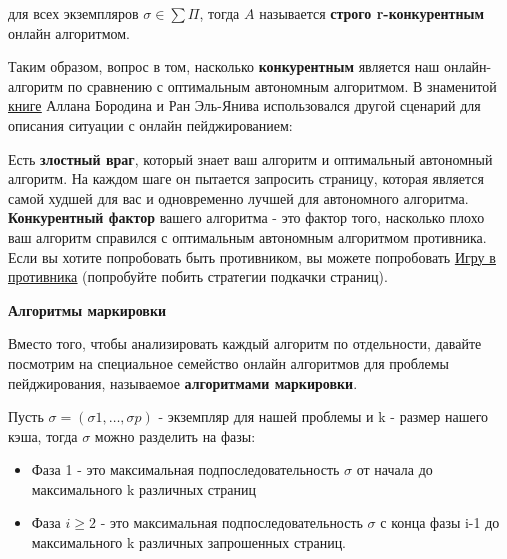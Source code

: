 для всех экземпляров $\sigma\in\sum\Pi$, тогда $A$ называется \textbf{строго r-конкурентным} онлайн алгоритмом.

\vspace{\baselineskip}

Таким образом, вопрос в том, насколько \textbf{конкурентным} является наш онлайн-алгоритм по сравнению с оптимальным автономным алгоритмом. В знаменитой \href{http://www.cs.technion.ac.il/~rani/book.html}{\underline{книге}} Аллана Бородина и Ран Эль-Янива использовался другой сценарий для описания ситуации с онлайн пейджированием:

\vspace{\baselineskip}

Есть \textbf{злостный враг}, который знает ваш алгоритм и оптимальный автономный алгоритм. На каждом шаге он пытается запросить страницу, которая является самой худшей для вас и одновременно лучшей для автономного алгоритма. \textbf{Конкурентный фактор} вашего алгоритма - это фактор того, насколько плохо ваш алгоритм справился с оптимальным автономным алгоритмом противника. Если вы хотите попробовать быть противником, вы можете попробовать \href{https://pastebin.com/u/kgoedde/1/Wak9refA}{\underline{Игру в противника}} (попробуйте побить стратегии подкачки страниц).

\vspace{\baselineskip}

\textbf{Алгоритмы маркировки}

\vspace{\baselineskip}

Вместо того, чтобы анализировать каждый алгоритм по отдельности, давайте посмотрим на специальное семейство онлайн алгоритмов для проблемы пейджирования, называемое \textbf{алгоритмами маркировки}.

\vspace{\baselineskip}

Пусть $\sigma = (\sigma 1, \dots, \sigma p)$ - экземпляр для нашей проблемы и k - размер нашего кэша, тогда $\sigma$ можно разделить на фазы:

\begin{itemize}
    \item Фаза 1 - это максимальная подпоследовательность $\sigma$ от начала до максимального k различных страниц
    \item Фаза $i \geq 2$ - это максимальная подпоследовательность $\sigma$ с конца фазы i-1 до максимального k различных запрошенных страниц.
\end{itemize}

